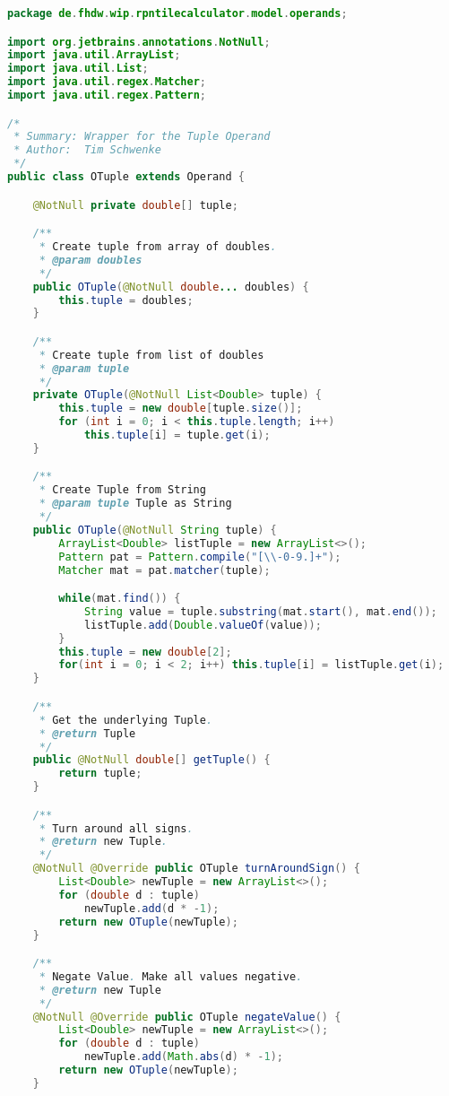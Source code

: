 \begin{lstlisting}[caption=OTuple (Schwenke),label=list:OTuple,language=Java]
package de.fhdw.wip.rpntilecalculator.model.operands;

import org.jetbrains.annotations.NotNull;
import java.util.ArrayList;
import java.util.List;
import java.util.regex.Matcher;
import java.util.regex.Pattern;

/*
 * Summary: Wrapper for the Tuple Operand
 * Author:  Tim Schwenke
 */
public class OTuple extends Operand {

    @NotNull private double[] tuple;

    /**
     * Create tuple from array of doubles.
     * @param doubles
     */
    public OTuple(@NotNull double... doubles) {
        this.tuple = doubles;
    }

    /**
     * Create tuple from list of doubles
     * @param tuple
     */
    private OTuple(@NotNull List<Double> tuple) {
        this.tuple = new double[tuple.size()];
        for (int i = 0; i < this.tuple.length; i++)
            this.tuple[i] = tuple.get(i);
    }

    /**
     * Create Tuple from String
     * @param tuple Tuple as String
     */
    public OTuple(@NotNull String tuple) {
        ArrayList<Double> listTuple = new ArrayList<>();
        Pattern pat = Pattern.compile("[\\-0-9.]+");
        Matcher mat = pat.matcher(tuple);

        while(mat.find()) {
            String value = tuple.substring(mat.start(), mat.end());
            listTuple.add(Double.valueOf(value));
        }
        this.tuple = new double[2];
        for(int i = 0; i < 2; i++) this.tuple[i] = listTuple.get(i);
    }

    /**
     * Get the underlying Tuple.
     * @return Tuple
     */
    public @NotNull double[] getTuple() {
        return tuple;
    }

    /**
     * Turn around all signs.
     * @return new Tuple.
     */
    @NotNull @Override public OTuple turnAroundSign() {
        List<Double> newTuple = new ArrayList<>();
        for (double d : tuple)
            newTuple.add(d * -1);
        return new OTuple(newTuple);
    }

    /**
     * Negate Value. Make all values negative.
     * @return new Tuple
     */
    @NotNull @Override public OTuple negateValue() {
        List<Double> newTuple = new ArrayList<>();
        for (double d : tuple)
            newTuple.add(Math.abs(d) * -1);
        return new OTuple(newTuple);
    }


\end{lstlisting}
